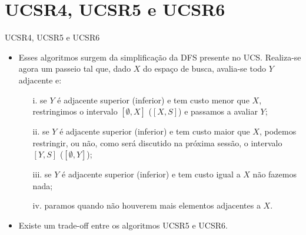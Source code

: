 \documentclass{beamer}
\begin{document}
\section{UCSR4, UCSR5 e UCSR6}
\begin{frame}{UCSR4, UCSR5 e UCSR6}
    \begin{itemize}
        \item{Esses algoritmos surgem da simplificação da DFS presente
            no UCS. Realiza-se agora um passeio tal que, dado $X$ do 
            espaço de busca, avalia-se todo $Y$ adjacente e:}
            \begin{itemize}
                \item[i.] se $Y$ é adjacente superior (inferior) e tem
                    custo menor que $X$, restringimos o intervalo
                    $[\emptyset, X]$ ($[X, S]$) e passamos a avaliar 
                    $Y$;
                \item[ii.] se $Y$ é adjacente superior (inferior) e tem
                    custo maior que $X$, podemos restringir, ou não, 
                    como será discutido na próxima sessão, o intervalo 
                    $[Y, S]$ ($[\emptyset, Y]$);
                \item[iii.] se $Y$ é adjacente superior (inferior) e
                    tem custo igual a $X$ não fazemos nada;
                \item[iv.] paramos quando não houverem mais elementos 
                    adjacentes a $X$.
            \end{itemize}
        \item{Existe um trade-off entre os algoritmos UCSR5 e UCSR6.}
    \end{itemize}
\end{frame}
\end{document}
